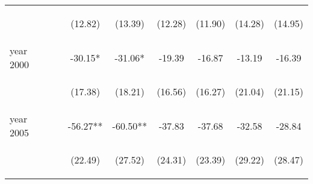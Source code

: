 \begin{landscape}
\begin{table}[htpb!]
\begin{center}
\begin{tabular}{lcccccccc}
&&&\begin{footnotesize}(12.82)\end{footnotesize}&\begin{footnotesize}(13.39)\end{footnotesize}&\begin{footnotesize}(12.28)\end{footnotesize}&\begin{footnotesize}(11.90)\end{footnotesize}&\begin{footnotesize}(14.28)\end{footnotesize}&\begin{footnotesize}(14.95)\end{footnotesize}\\
year 2000&&&-30.15*&-31.06*&-19.39&-16.87&-13.19&-16.39\\
&&&\begin{footnotesize}(17.38)\end{footnotesize}&\begin{footnotesize}(18.21)\end{footnotesize}&\begin{footnotesize}(16.56)\end{footnotesize}&\begin{footnotesize}(16.27)\end{footnotesize}&\begin{footnotesize}(21.04)\end{footnotesize}&\begin{footnotesize}(21.15)\end{footnotesize}\\
year 2005&&&-56.27**&-60.50**&-37.83&-37.68&-32.58&-28.84\\
&&&\begin{footnotesize}(22.49)\end{footnotesize}&\begin{footnotesize}(27.52)\end{footnotesize}&\begin{footnotesize}(24.31)\end{footnotesize}&\begin{footnotesize}(23.39)\end{footnotesize}&\begin{footnotesize}(29.22)\end{footnotesize}&\begin{footnotesize}(28.47)\end{footnotesize}\\

\end{tabular}
\end{center}
\end{table}
\end{landscape}
